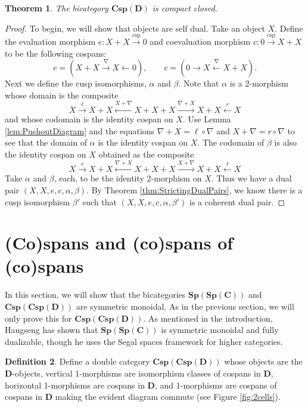 \documentclass[11pt]{amsart}
\newcommand{\cat}[1]{\mathbf{#1}}
\newcommand{\from}{\colon}
\newcommand{\xto}[1]{\xrightarrow{#1}}
\newcommand{\tocospan}{\xrightarrow{\mathrm{csp}}}
\newcommand{\bicspmap}[1]{\mathbf{Csp(#1)}}
\newcommand{\bispsp}[1]{\mathbf{Sp(Sp(#1))}}
\newcommand{\bicspcsp}[1]{\mathbf{Csp(Csp(#1))}}
\newtheorem{thm}{Theorem}[section]
\theoremstyle{remark}
\theoremstyle{definition}
\newtheorem{defn}[thm]{Definition}
\begin{document}
\begin{thm}
	\label{thm:SpansMapsAreCCBicat}
	The bicategory $\bicspmap{D}$ is compact closed.
\end{thm}

\begin{proof}
	To begin, we will show that objects are self dual. 
	Take an object $X$.  
	Define the evaluation morphism 
		$e \from X + X \tocospan 0$ 
	and coevaluation morphism 
		$c \from 0 \tocospan X+X$ 
	to be the following cospans:
	\[
		e = (X+X \xto{\nabla} X \gets 0), 
		\quad \quad 
		c = (0 \to X \xleftarrow{\nabla} X+X).
	\]
	Next we define the cusp isomorphisms, 
		$\alpha$ and $\beta$.
	Note that $\alpha$ is a 2-morphism 
	whose domain is the composite 
	\[
		X \xto{\ell}
		X+X \xleftarrow{X+\nabla}
		X+X+X \xto{\nabla +X}
		X+X \xleftarrow{r}
		X
	\]
	and whose codomain is the identity cospan on $X$.  
	Use Lemma \ref{lem:PushoutDiagram} 
	and the equations
		$\nabla+X = \ell \circ \nabla$ 
	and 
		$X + \nabla = r \circ \nabla$ 
	to see that the domain of $\alpha$ is 
	the identity cospan on $X$.  
	The codomain of $\beta$ is also 
	the identity cospan on $X$
	obtained as the composite 
	\[
		X \xto{r}
		X+X \xleftarrow{\nabla+X}
		X+X+X \xto{X+\nabla}
		X+X \xleftarrow{\ell}
		X
	\]
	Take $\alpha$ and $\beta$, each, 
	to be the identity 2-morphism on $X$. 
	Thus we have a dual pair 
		$(X,X,e,c,\alpha,\beta)$. 
	By Theorem 
		\ref{thm:StrictingDualPairs}, 
	we know there is a cusp isomorphism $\beta'$ 
	such that 
		$(X,X,e,c,\alpha,\beta')$ 
	is a coherent dual pair.  
\end{proof}

\section{(Co)spans and (co)spans of (co)spans}                  
\label{sec:SpansSpans}

In this section, we will show that the bicategories 
	$\bispsp{C}$ and $\bicspcsp{D}$ 
are symmetric monoidal. 
As in the previous section, 
we will only prove this for $\bicspcsp{D}$.  
As mentioned in the introduction, 
Haugseng \cite{Haug} has shown that
$\bispsp{C}$ is symmetric monoidal and
fully dualizable, though he uses
the Segal spaces framework for higher categories.

\begin{defn}
\label{def:DblCatSpanSpan}
	Define a double category 
		$\bicspcsp{D}$ 
	whose objects are the $\cat{D}$-objects, 
	vertical 1-morphisms are isomorphism classes of cospans in $\cat{D}$, 
	horizontal 1-morphisms are cospans in $\cat{D}$, and 
	1-morphisms are cospans of cospans in $\cat{D}$ 
	making the evident diagram commute (see Figure \ref{fig:2cells}). 
\end{defn}
\end{document}
